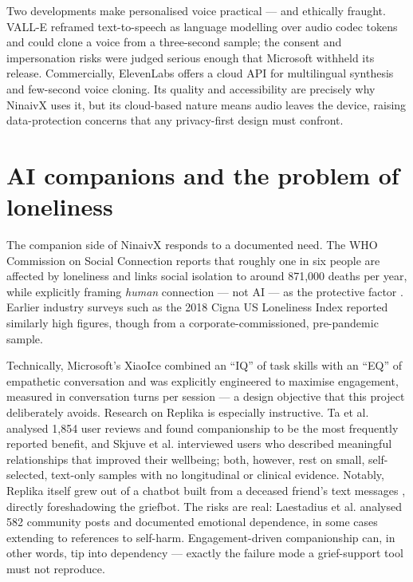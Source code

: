 \documentclass[11pt,a4paper]{report}
\begin{document}
Two developments make personalised voice practical --- and ethically fraught. VALL-E \cite{wang2023valle} reframed text-to-speech as language modelling over audio codec tokens and could clone a voice from a three-second sample; the consent and impersonation risks were judged serious enough that Microsoft withheld its release. Commercially, ElevenLabs \cite{elevenlabs} offers a cloud API for multilingual synthesis and few-second voice cloning. Its quality and accessibility are precisely why NinaivX uses it, but its cloud-based nature means audio leaves the device, raising data-protection concerns that any privacy-first design must confront.

\section{AI companions and the problem of loneliness}
The companion side of NinaivX responds to a documented need. The WHO Commission on Social Connection reports that roughly one in six people are affected by loneliness and links social isolation to around 871{,}000 deaths per year, while explicitly framing \emph{human} connection --- not AI --- as the protective factor \cite{who2025loneliness}. Earlier industry surveys such as the 2018 Cigna US Loneliness Index \cite{cigna2018loneliness} reported similarly high figures, though from a corporate-commissioned, pre-pandemic sample.

Technically, Microsoft's XiaoIce \cite{zhou2020xiaoice} combined an ``IQ'' of task skills with an ``EQ'' of empathetic conversation and was explicitly engineered to maximise engagement, measured in conversation turns per session --- a design objective that this project deliberately avoids. Research on Replika is especially instructive. Ta et al. \cite{ta2020user} analysed 1{,}854 user reviews and found companionship to be the most frequently reported benefit, and Skjuve et al. \cite{skjuve2021chatbot} interviewed users who described meaningful relationships that improved their wellbeing; both, however, rest on small, self-selected, text-only samples with no longitudinal or clinical evidence. Notably, Replika itself grew out of a chatbot built from a deceased friend's text messages \cite{replika}, directly foreshadowing the griefbot. The risks are real: Laestadius et al. \cite{laestadius2024human} analysed 582 community posts and documented emotional dependence, in some cases extending to references to self-harm. Engagement-driven companionship can, in other words, tip into dependency --- exactly the failure mode a grief-support tool must not reproduce.
\end{document}
